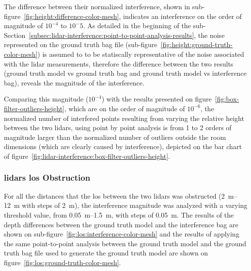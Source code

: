 The difference between their normalized interference, shown in sub-figure~\ref{fig:height:difference-color-mesh}, indicates an interference on the order of magnitude of $10^{-4}$ to $10^-{5}$. As detailed in the beginning of the sub-Section~\ref{subsec:lidar-interference:point-to-point-analysis-results}, the noise represented on the ground truth bag file (sub-figure~\ref{fig:height:ground-truth-color-mesh}) is assumed to to be statiscally representative of the noise associated with the \ac{lidar} measurements, therefore the difference between the two results (ground truth model vs ground truth bag and ground truth model vs interference bag), reveals the magnitude of the interference. 

Comparing this magnitude ($10^{-4}$) with the results presented on figure~\ref{fig:box-filter-outliers-height}, which are on the order of magnitude of $10^{-6}$, the normalized number of interfered points resulting from varying the relative height between the two \acp{lidar}, using point by point analysis is from 1 to 2 orders of magnitude larger than the normalized number of outliers outside the room dimensions (which are clearly caused by interference), depicted on the bar chart of figure~\ref{fig:lidar-interference:box-filter-outliers-height}.

\subsubsection{\acp{lidar} \acl{los} Obstruction}
For all the distances that the \acf{los} between the two \acp{lidar} was obstructed (\SIrange{2}{12}{\meter} with steps of \SI{2}{\meter}), the interference magnitude was analyzed with a varying threshold value, from \SIrange{0.05}{1.5}{\meter}, with steps of \SI{0.05}{\meter}. The results of the depth differences between the ground truth model and the interference bag are shown on sub-figure~\ref{fig:los:interference-color-mesh} and the results of applying the same point-to-point analysis between the ground truth model and the ground truth bag file used to generate the ground truth model are shown on figure~\ref{fig:los:ground-truth-color-mesh}.

